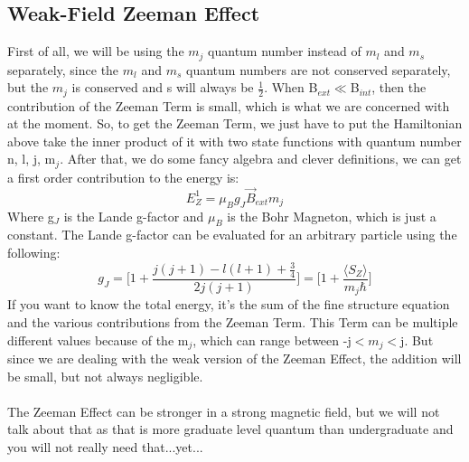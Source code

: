 \documentclass[garamond]{article}
\begin{document}
\subsection{Weak-Field Zeeman Effect}
First of all, we will be using the $m_j$ quantum number instead of $m_l$ and $m_s$ separately, since the $m_l$ and $m_s$ quantum numbers are not conserved separately, but the $m_j$ is conserved and s will always be $\frac{1}{2}$. When B$_{ext}\ll$B$_{int}$, then the contribution of the Zeeman Term is small, which is what we are concerned with at the moment. So, to get the Zeeman Term, we just have to put the Hamiltonian above take the inner product of it with two state functions with quantum number n, l, j, m$_j$. After that, we do some fancy algebra and clever definitions, we can get a first order contribution to the energy is:
\begin{equation}
E_Z^1=\mu_Bg_J\vec{B}_{ext}m_j
\end{equation}
Where g$_J$ is the Lande g-factor and $\mu_B$ is the Bohr Magneton, which is just a constant. The Lande g-factor can be evaluated for an arbitrary particle using the following:
\begin{equation}
g_J=\bigg[1+\frac{j(j+1)-l(l+1)+\frac{3}{4}}{2j(j+1)}\bigg]=\bigg[1+\frac{\langle S_Z\rangle}{m_j\hbar}\bigg]
\end{equation}
If you want to know the total energy, it's the sum of the fine structure equation and the various contributions from the Zeeman Term. This Term can be multiple different values because of the m$_j$, which can range between -j$<m_j<$j. But since we are dealing with the weak version of the Zeeman Effect, the addition will be small, but not always negligible.\\
\\
The Zeeman Effect can be stronger in a strong magnetic field, but we will not talk about that as that is more graduate level quantum than undergraduate and you will not really need that...yet...
\end{document}
